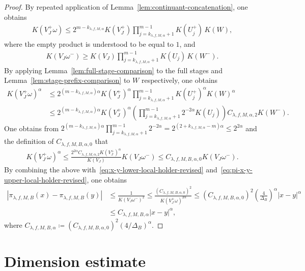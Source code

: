 \documentclass[12pt,reqno]{amsart}
\theoremstyle{definition}
\theoremstyle{plain}
\begin{document}
\begin{proof}
By repeated application of Lemma~\ref{lem:continuant-concatenation}, one obtains
\begin{align*}
    K(V^+_J\omega)
    \leq
    2^{m-k_{\lambda,f,M,\alpha}}
    K(V^+_J)
    \prod_{j=k_{\lambda,f,M,\alpha}+1}^{m-1}K(U^+_j)\,K(W),
\end{align*}
where the empty product is understood to be equal to $1$, and
\begin{align*}
    K(V_J\omega^-)
    \geq
    K(V_J)
    \prod_{j=k_{\lambda,f,M,\alpha}+1}^{m-1}K(U_j)\,K(W^-).
\end{align*}
By applying Lemma~\ref{lem:full-stage-comparison} to the full stages and Lemma~\ref{lem:stage-prefix-comparison} to $W$ respectively, one obtains
\begin{align*}
    K(V^+_J\omega)^\alpha
    &\leq
    2^{(m-k_{\lambda,f,M,\alpha})\alpha}
    K(V^+_J)^\alpha
    \prod_{j=k_{\lambda,f,M,\alpha}+1}^{m-1}K(U^+_j)^\alpha
    K(W)^\alpha \\
    &\leq
    2^{(m-k_{\lambda,f,M,\alpha})\alpha}
    K(V^+_J)^\alpha
    \left(\prod_{j=k_{\lambda,f,M,\alpha}+1}^{m-1}2^{-2\alpha}K(U_j)\right)
    C_{\lambda,f,M,\alpha,2}K(W^-).
\end{align*}
One obtains from $2^{(m-k_{\lambda,f,M,\alpha})\alpha}\prod_{j=k_{\lambda,f,M,\alpha}+1}^{m-1}2^{-2\alpha}=2^{(2+k_{\lambda,f,M,\alpha}-m)\alpha}\leq 2^{2\alpha}$ and the definition of $C_{\lambda,f,M,B,\alpha,0}$ that
\begin{align*}
    K(V^+_J\omega)^\alpha
    \leq
    \frac{2^{2\alpha}C_{\lambda,f,M,\alpha,2}K(V^+_J)^\alpha}{K(V_J)}
    K(V_J\omega^-)
    \leq
    C_{\lambda,f,M,B,\alpha,0}K(V_J\omega^-).
\end{align*}
By combining the above with~\eqref{eq:x-y-lower-local-holder-revised} and~\eqref{eq:pi-x-y-upper-local-holder-revised}, one obtains
\begin{align*}
    \left|\pi_{\lambda,f,M,B}(x)-\pi_{\lambda,f,M,B}(y)\right|
    &\leq \frac{1}{K(V_J\omega^-)^2} 
    \leq \frac{(C_{\lambda,f,M,B,\alpha,0})^2}{K(V^+_J\omega)^{2\alpha}}
    \leq (C_{\lambda,f,M,B,\alpha,0})^2\left(\frac{4}{\Delta_B}\right)^\alpha \left|x-y\right|^\alpha \\
    &\leq C_{\lambda,f,M,B,\alpha}\left|x-y\right|^\alpha,
\end{align*}
where $C_{\lambda,f,M,B,\alpha}\coloneqq (C_{\lambda,f,M,B,\alpha,0})^2({4}/{\Delta_B})^\alpha$.
\end{proof}

\section{Dimension estimate}
\end{document}
